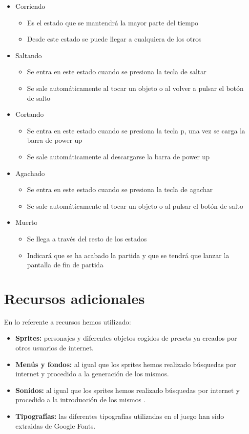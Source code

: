 \documentclass[palatino]{apuntes}
\begin{document}
\begin{itemize}
    \item Corriendo
    \begin{itemize}
        \item Es el estado que se mantendrá la mayor parte del tiempo
        \item Desde este estado se puede llegar a cualquiera de los otros
    \end{itemize}
    \item Saltando
    \begin{itemize}
        \item Se entra en este estado cuando se presiona la tecla de saltar
        \item Se sale automáticamente al tocar un objeto o al volver a pulsar el botón de salto
    \end{itemize}
   \item Cortando
    \begin{itemize}
        \item Se entra en este estado cuando se presiona la tecla p, una vez se carga la barra de power up
        \item Se sale automáticamente al descargarse la barra de power up
    \end{itemize}
    \item Agachado
    \begin{itemize}
        \item Se entra en este estado cuando se presiona la tecla de agachar
        \item Se sale automáticamente al tocar un objeto o al pulsar el botón de salto 
    \end{itemize}
    \item Muerto
    \begin{itemize}
        \item Se llega a través del resto de los estados
        \item Indicará que se ha acabado la partida y que se tendrá que lanzar la pantalla de fin de partida
    \end{itemize}
\end{itemize}


\section{Recursos adicionales}
En lo referente a recursos hemos utilizado:

\begin{itemize}
	\item \textbf{Sprites:} personajes y diferentes objetos  cogidos de presets ya creados por otros usuarios de internet.
	\item \textbf{Menús y fondos:} al igual que los sprites hemos realizado búsquedas por internet y procedido a la generación de los mismos.
	\item \textbf{Sonidos:} al igual que los sprites hemos realizado búsquedas por internet y procedido a la introducción de los mismos .
	\item \textbf{Tipografías:} las diferentes tipografías utilizadas en el juego han sido extraidas de Google Fonts.
\end{itemize}
\end{document}

